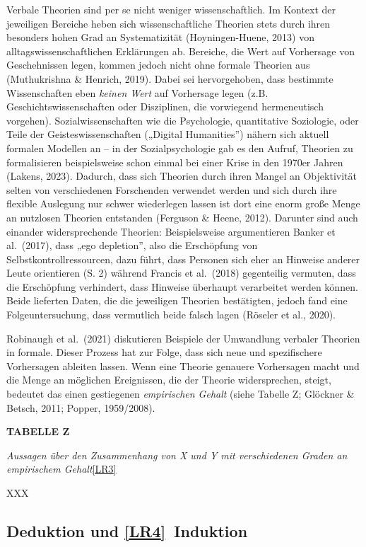\documentclass[
  letterpaper,
  DIV=11,
  numbers=noendperiod]{scrreprt}
\begin{document}
Verbale Theorien sind per se nicht weniger wissenschaftlich. Im Kontext
der jeweiligen Bereiche heben sich wissenschaftliche Theorien stets
durch ihren besonders hohen Grad an Systematizität (Hoyningen-Huene,
2013) von alltagswissenschaftlichen Erklärungen ab. Bereiche, die Wert
auf Vorhersage von Geschehnissen legen, kommen jedoch nicht ohne formale
Theorien aus (Muthukrishna \& Henrich, 2019). Dabei sei hervorgehoben,
dass bestimmte Wissenschaften eben \emph{keinen Wert} auf Vorhersage
legen (z.B. Geschichtswissenschaften oder Disziplinen, die vorwiegend
hermeneutisch vorgehen). Sozialwissenschaften wie die Psychologie,
quantitative Soziologie, oder Teile der Geisteswissenschaften („Digital
Humanities'') nähern sich aktuell formalen Modellen an -- in der
Sozialpsychologie gab es den Aufruf, Theorien zu formalisieren
beispielsweise schon einmal bei einer Krise in den 1970er Jahren
(Lakens, 2023). Dadurch, dass sich Theorien durch ihren Mangel an
Objektivität selten von verschiedenen Forschenden verwendet werden und
sich durch ihre flexible Auslegung nur schwer wiederlegen lassen ist
dort eine enorm große Menge an nutzlosen Theorien entstanden (Ferguson
\& Heene, 2012). Darunter sind auch einander widersprechende Theorien:
Beispielsweise argumentieren Banker et al.~(2017), dass „ego
depletion'', also die Erschöpfung von Selbstkontrollressourcen, dazu
führt, dass Personen sich eher an Hinweise anderer Leute orientieren (S.
2) während Francis et al.~(2018) gegenteilig vermuten, dass die
Erschöpfung verhindert, dass Hinweise überhaupt verarbeitet werden
können. Beide lieferten Daten, die die jeweiligen Theorien bestätigten,
jedoch fand eine Folgeuntersuchung, dass vermutlich beide falsch lagen
(Röseler et al., 2020).

Robinaugh et al.~(2021) diskutieren Beispiele der Umwandlung verbaler
Theorien in formale. Dieser Prozess hat zur Folge, dass sich neue und
spezifischere Vorhersagen ableiten lassen. Wenn eine Theorie genauere
Vorhersagen macht und die Menge an möglichen Ereignissen, die der
Theorie widersprechen, steigt, bedeutet das einen gestiegenen
\emph{empirischen Gehalt} (siehe Tabelle Z; Glöckner \& Betsch, 2011;
Popper, 1959/2008).

\textbf{TABELLE Z}

\emph{Aussagen über den Zusammenhang von X und Y mit verschiedenen
Graden an empirischem Gehalt}\hyperref[_msocom_3]{{[}LR3{]}}~

XXX

\subsection{\texorpdfstring{Deduktion und
\hyperref[_msocom_4]{{[}LR4{]}}~Induktion}{Deduktion und {[}LR4{]}~Induktion}}\label{deduktion-und-lr4-induktion}
\end{document}
